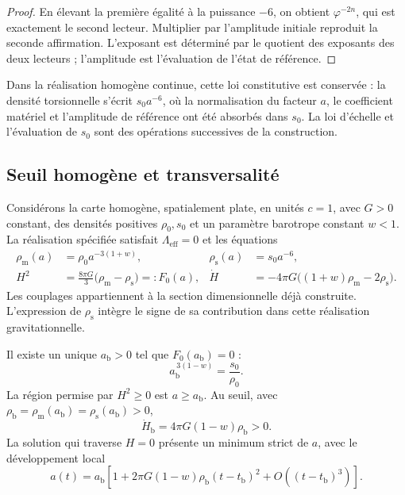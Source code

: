 \begin{proof}
En élevant la première égalité à la puissance \(-6\), on obtient \(\varphi^{-2n}\), qui est exactement le second lecteur. Multiplier par l'amplitude initiale reproduit la seconde affirmation. L'exposant est déterminé par le quotient des exposants des deux lecteurs ; l'amplitude est l'évaluation de l'état de référence.
\end{proof}

Dans la réalisation homogène continue, cette loi constitutive est conservée :
la densité torsionnelle s'écrit \(s_0a^{-6}\), où la normalisation
du facteur \(a\), le coefficient matériel et l'amplitude de référence
ont été absorbés dans \(s_0\). La loi d'échelle et l'évaluation de
\(s_0\) sont des opérations successives de la construction.

\subsection{Seuil homogène et transversalité}
\label{vii:vii:sec:umbral-rebote}

Considérons la carte homogène, spatialement plate, en unités \(c=1\),
avec \(G>0\) constant, des densités positives \(\rho_0,s_0\) et un paramètre
barotrope constant \(w<1\). La réalisation spécifiée satisfait
\(\Lambda_{\mathrm{eff}}=0\) et les équations
\begin{align}
 \rho_{\mathrm m}(a)&=\rho_0a^{-3(1+w)},&
 \rho_{\mathrm s}(a)&=s_0a^{-6},\\
 H^2&=\frac{8\pi G}{3}
        \bigl(\rho_{\mathrm m}-\rho_{\mathrm s}\bigr)
        =:F_0(a),&
 \dot H&=-4\pi G
        \bigl((1+w)\rho_{\mathrm m}-2\rho_{\mathrm s}\bigr).
 \label{vii:vii:eq:dinamica-homogenea}
\end{align}
Les couplages appartiennent à la section dimensionnelle déjà construite.
L'expression de \(\rho_{\mathrm s}\) intègre le signe de sa contribution
dans cette réalisation gravitationnelle.

\begin{theorem}
\label{vii:vii:thm:rebote}
Il existe un unique \(a_{\mathrm b}>0\) tel que \(F_0(a_{\mathrm b})=0\) :
\[
 a_{\mathrm b}^{\,3(1-w)}=\frac{s_0}{\rho_0}.
\]
La région permise par \(H^2\geq0\) est \(a\geq a_{\mathrm b}\).
Au seuil, avec
\(\rho_{\mathrm b}=\rho_{\mathrm m}(a_{\mathrm b})
                  =\rho_{\mathrm s}(a_{\mathrm b})>0\),
\[
 \dot H_{\mathrm b}=4\pi G(1-w)\rho_{\mathrm b}>0.
\]
La solution qui traverse \(H=0\) présente un minimum strict de \(a\), avec le développement local
\[
 a(t)=a_{\mathrm b}\left[
 1+2\pi G(1-w)\rho_{\mathrm b}(t-t_{\mathrm b})^2
 +O((t-t_{\mathrm b})^3)\right].
\]
\end{theorem}

